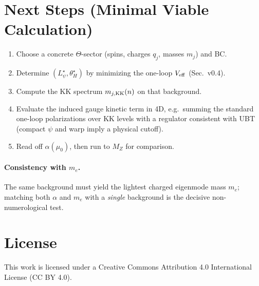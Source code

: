\documentclass[12pt]{article}
\begin{document}
\section{Next Steps (Minimal Viable Calculation)}
\begin{enumerate}
\item Choose a concrete $\Theta$-sector (spins, charges $q_j$, masses $m_j$) and BC.
\item Determine $(L_\psi^\star,\theta_H^\star)$ by minimizing the one-loop $V_{\rm eff}$ (Sec.~v0.4).
\item Compute the KK spectrum $m_{j,{\rm KK}}(n)$ on that background.
\item Evaluate the induced gauge kinetic term in 4D, e.g.\ summing the standard one-loop polarizations over KK levels with a regulator consistent with UBT (compact $\psi$ and warp imply a physical cutoff).
\item Read off $\alpha(\mu_0)$, then run to $M_Z$ for comparison.
\end{enumerate}

\paragraph{Consistency with $m_e$.}
The same background must yield the lightest charged eigenmode mass $m_e$; matching both $\alpha$ and $m_e$ with a \emph{single} background is the decisive non-numerological test.


\section*{License}
This work is licensed under a Creative Commons Attribution 4.0 International License (CC BY 4.0).
\end{document}
